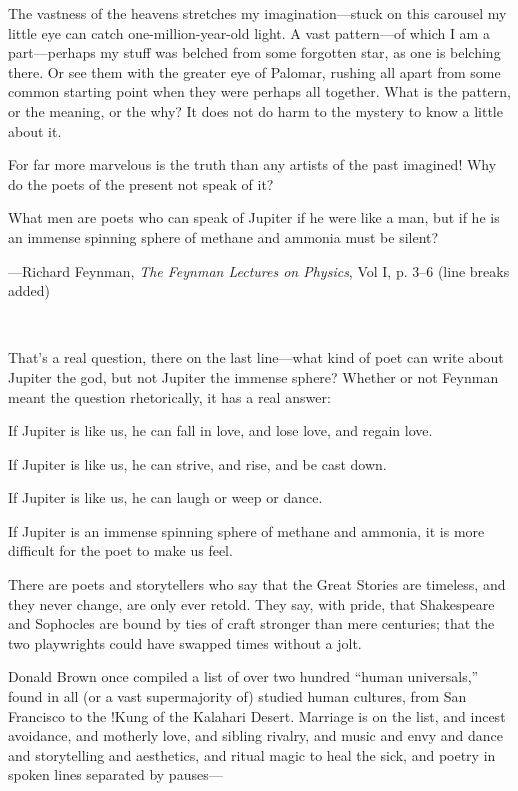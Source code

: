 {
 The vastness of the heavens stretches my imagination---stuck on
this carousel my little eye can catch one-million-year-old light. A
vast pattern---of which I am a part---perhaps my stuff was belched from
some forgotten star, as one is belching there. Or see them with the
greater eye of Palomar, rushing all apart from some common starting
point when they were perhaps all together. What is the pattern, or the
meaning, or the why? It does not do harm to the mystery to know a
little about it.}

{
 For far more marvelous is the truth than any artists of the past
imagined! Why do the poets of the present not speak of it?}

{
 What men are poets who can speak of Jupiter if he were like a man,
but if he is an immense spinning sphere of methane and ammonia must be
silent?}

{\raggedleft
 {}---Richard Feynman, \textit{The Feynman Lectures on
Physics},\newline
 Vol I, p. 3--6 (line breaks added)
\par}


\bigskip

{
 ~}

{
 That's a real question, there on the last
line---what kind of poet can write about Jupiter the god, but not
Jupiter the immense sphere? Whether or not Feynman meant the question
rhetorically, it has a real answer:}

{
 If Jupiter is like us, he can fall in love, and lose love, and
regain love.}

{
 If Jupiter is like us, he can strive, and rise, and be cast down.}

{
 If Jupiter is like us, he can laugh or weep or dance.}

{
 If Jupiter is an immense spinning sphere of methane and ammonia,
it is more difficult for the poet to make us feel.}

{
 There are poets and storytellers who say that the Great Stories
are timeless, and they never change, are only ever retold. They say,
with pride, that Shakespeare and Sophocles are bound by ties of craft
stronger than mere centuries; that the two playwrights could have
swapped times without a jolt.}

{
 Donald Brown once compiled a list of over two hundred
``human universals,'' found in all
(or a vast supermajority of) studied human cultures, from San Francisco
to the !Kung of the Kalahari Desert. Marriage is on the list, and
incest avoidance, and motherly love, and sibling rivalry, and music and
envy and dance and storytelling and aesthetics, and ritual magic to
heal the sick, and poetry in spoken lines separated by pauses---}

